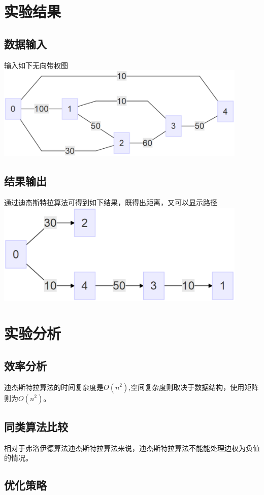 \documentclass[a4paper,10pt]{ctexart}
\begin{document}
\section{实验结果}
\subsection{数据输入}
输入如下无向带权图\\
\includegraphics[width=0.9\textwidth]{../Pics/Test-MinLen.eps}
\subsection{结果输出}
通过迪杰斯特拉算法可得到如下结果，既得出距离，又可以显示路径\\
\includegraphics[width=0.9\textwidth]{../Pics/Test-MinLen-out.eps}

\section{实验分析}
\subsection{效率分析}
迪杰斯特拉算法的时间复杂度是$O(n^2)$,空间复杂度则取决于数据结构，使用矩阵则为$O(n^2)$。
\subsection{同类算法比较}
相对于弗洛伊德算法迪杰斯特拉算法来说，迪杰斯特拉算法不能能处理边权为负值的情况。
\subsection{优化策略}
\end{document}
